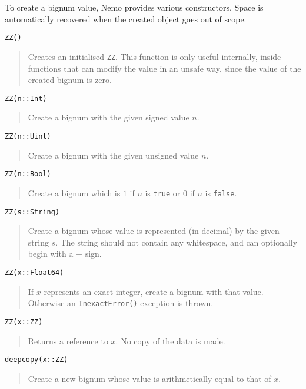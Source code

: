 \documentclass[a4paper,10pt]{article}
\newcommand{\code}{\lstinline}
\newcommand{\desc}[1]{\vspace{-3mm}\begin{quote}#1\end{quote}}
\begin{document}
{To create a bignum value, Nemo provides various constructors. Space is automatically
recovered when the created object goes out of scope.

\begin{lstlisting}
ZZ()
\end{lstlisting}

\desc{Creates an initialised \code{ZZ}. This function is only useful internally, 
inside functions that can modify the value in an unsafe way, since the value of the
created bignum is zero.}

\begin{lstlisting}
ZZ(n::Int)
\end{lstlisting}

\desc{Create a bignum with the given signed value $n$.}

\begin{lstlisting}
ZZ(n::Uint)
\end{lstlisting}

\desc{Create a bignum with the given unsigned value $n$.}

\begin{lstlisting}
ZZ(n::Bool)
\end{lstlisting}

\desc{Create a bignum which is $1$ if $n$ is \code{true} or $0$ if $n$ is 
\code{false}.}

\begin{lstlisting}
ZZ(s::String)
\end{lstlisting}

\desc{Create a bignum whose value is represented (in decimal) by the given string
$s$. The string should not contain any whitespace, and can optionally begin with
a $-$ sign.}

\begin{lstlisting}
ZZ(x::Float64)
\end{lstlisting}

\desc{If $x$ represents an exact integer, create a bignum with that value. Otherwise
an \code{InexactError()} exception is thrown.}

\begin{lstlisting}
ZZ(x::ZZ)
\end{lstlisting}

\desc{Returns a reference to $x$. No copy of the data is made.}

\begin{lstlisting}
deepcopy(x::ZZ)
\end{lstlisting}

\desc{Create a new bignum whose value is arithmetically equal to that of $x$.}

}
\end{document}

